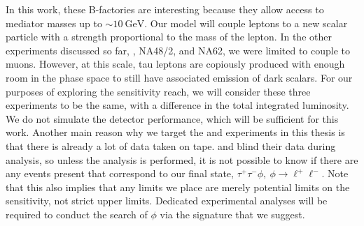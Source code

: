 In this work, these B-factories are interesting because they allow access to mediator masses up to $\sim 10~\textrm{GeV}$.
Our model will couple leptons to a new scalar particle with a strength proportional to the mass of the lepton.
In the other experiments discussed so far, \mueee, NA48/2, and NA62, we were limited to couple to muons.
However, at this scale, tau leptons are copiously produced with enough room in the phase space to still have associated emission of dark scalars.
For our purposes of exploring the sensitivity reach, we will consider these three experiments to be the same, with a difference in the total integrated luminosity.
We do not simulate the detector performance, which will be sufficient for this work.
Another main reason why we target the \babar and \belle experiments in this thesis is that there is already a lot of data taken on tape.
\babar and \belle blind their data during analysis, so unless the analysis is performed, it is not possible to know if there are any events present that correspond to our final state, $\tau^+ \tau^- \phi,~\phi \rightarrow \ell^+ \ell^-$.
Note that this also implies that any limits we place are merely potential limits on the sensitivity, not strict upper limits.
Dedicated experimental analyses will be required to conduct the search of $\phi$ via the signature that we suggest.
